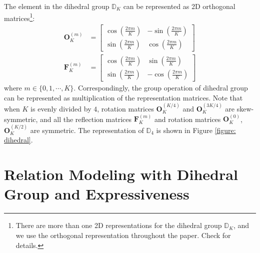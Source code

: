 \documentclass[11pt,a4paper]{article}
\begin{document}
The element in the dihedral group $\mathbb{D}_{K}$ can be represented as 2D orthogonal matrices\footnote{There are more than one 2D representations for the dihedral group $\mathbb{D}_{K}$, and we use the orthogonal representation throughout the paper. Check \citealt{group_rep} for details.}:
\begin{equation} \label{eq: D}
\begin{aligned}
\bm{O}_{K}^{(m)} &= \left[\begin{array}{cc}
\cos{\left(\frac{2\pi m}{K}\right)} & -\sin{\left(\frac{2\pi m}{K}\right)}\\
\sin{\left(\frac{2\pi m}{K}\right)} & \cos{\left(\frac{2\pi m}{K}\right)}
\end{array}\right]\\
\bm{F}_{K}^{(m)} &= \left[\begin{array}{cc}
\cos{\left(\frac{2\pi m}{K}\right)} & \sin{\left(\frac{2\pi m}{K}\right)}\\
\sin{\left(\frac{2\pi m}{K}\right)} & -\cos{\left(\frac{2\pi m}{K}\right)}
\end{array}\right]
\end{aligned}
\end{equation}
where $m \in \{0,1,\cdots, K\}$. Correspondingly, the group operation of dihedral group can be represented as multiplication of the representation matrices. Note that when $K$ is evenly divided by $4$, rotation matrices $\bm{O}_K^{(K/4)}$ and $\bm{O}_K^{(3K/4)}$ are skew-symmetric, and all the reflection matrices $\bm{F}_K^{(m)}$ and rotation matrices $\bm{O}_K^{(0)}$, $\bm{O}_K^{(K/2)}$ are symmetric. The representation of $\mathbb{D}_{4}$ is shown in Figure \ref{figure: dihedral}. 

 \section{Relation Modeling with Dihedral Group and Expressiveness}\label{sec: dihedral}
\end{document}
